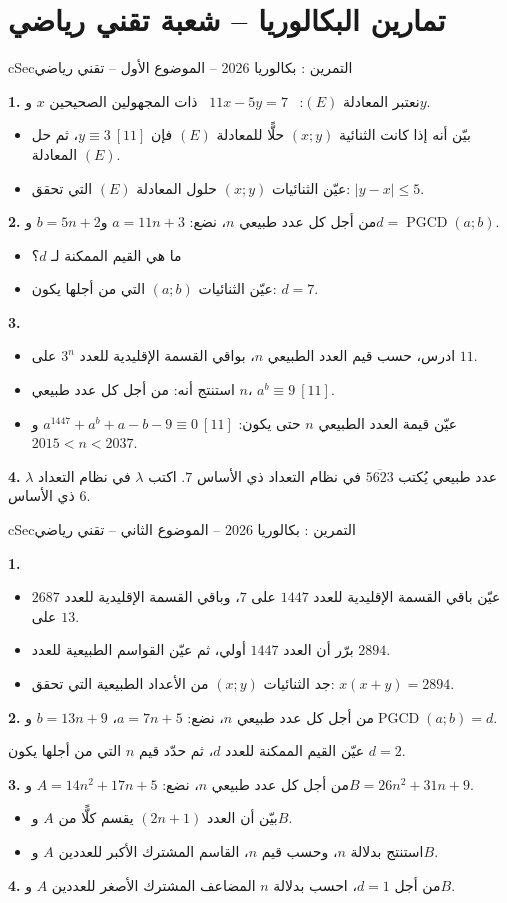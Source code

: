 \documentclass[12pt,a4paper]{article}
\newenvironment{BOX}[2]{\begin{otherlanguage}{english}\begin{arbox}{#1}{#2}}{\end{arbox}\end{otherlanguage}}
\newcounter{exo}
\newenvironment{tamrin}[1]{\stepcounter{exo}\begin{BOX}{cSec}{التمرين \theexo: #1}}{\end{BOX}}
\newcommand{\pgcd}{\operatorname{PGCD}}
\newenvironment{sq}{\begin{itemize}[leftmargin=2.4em,itemsep=3pt]}{\end{itemize}}
\newcommand{\qa}{\item[(أ)]}\newcommand{\qb}{\item[(ب)]}\newcommand{\qc}{\item[(جـ)]}\newcommand{\qd}{\item[(د)]}\newcommand{\qe}{\item[(هـ)]}
\newcommand{\QQ}[1]{\par\smallskip\textbf{#1.} }
\begin{document}
\section{تمارين البكالوريا -- شعبة تقني رياضي}
\begin{tamrin}{بكالوريا 2026 -- الموضوع الأول -- تقني رياضي}
\QQ{1} نعتبر المعادلة $(E)$: \ $11x-5y=7$ \ ذات المجهولين الصحيحين $x$ و$y$.
\begin{sq}
\qa بيّن أنه إذا كانت الثنائية $(x;y)$ حلًّا للمعادلة $(E)$ فإن $y\equiv 3\ [11]$، ثم حل المعادلة $(E)$.
\qb عيّن الثنائيات $(x;y)$ حلول المعادلة $(E)$ التي تحقق: $|y-x|\le 5$.
\end{sq}
\QQ{2} من أجل كل عدد طبيعي $n$، نضع: $a=11n+3$ و$b=5n+2$ و$d=\pgcd(a;b)$.
\begin{sq}
\qa ما هي القيم الممكنة لـ $d$؟
\qb عيّن الثنائيات $(a;b)$ التي من أجلها يكون: $d=7$.
\end{sq}
\QQ{3}
\begin{sq}
\qa ادرس، حسب قيم العدد الطبيعي $n$، بواقي القسمة الإقليدية للعدد $3^n$ على $11$.
\qb استنتج أنه: من أجل كل عدد طبيعي $n$، $a^b\equiv 9\ [11]$.
\qc عيّن قيمة العدد الطبيعي $n$ حتى يكون: $a^{1447}+a^b+a-b-9\equiv 0\ [11]$ و$2015<n<2037$.
\end{sq}
\QQ{4} $\lambda$ عدد طبيعي يُكتب $\overline{5623}$ في نظام التعداد ذي الأساس $7$. اكتب $\lambda$ في نظام التعداد ذي الأساس $6$.
\end{tamrin}

\begin{tamrin}{بكالوريا 2026 -- الموضوع الثاني -- تقني رياضي}
\QQ{1}
\begin{sq}
\qa عيّن باقي القسمة الإقليدية للعدد $1447$ على $7$، وباقي القسمة الإقليدية للعدد $2687$ على $13$.
\qb برّر أن العدد $1447$ أولي، ثم عيّن القواسم الطبيعية للعدد $2894$.
\qc جد الثنائيات $(x;y)$ من الأعداد الطبيعية التي تحقق: $x(x+y)=2894$.
\end{sq}
\QQ{2} من أجل كل عدد طبيعي $n$، نضع: $a=7n+5$، $b=13n+9$ و$\pgcd(a;b)=d$.

عيّن القيم الممكنة للعدد $d$، ثم حدّد قيم $n$ التي من أجلها يكون $d=2$.

\QQ{3} من أجل كل عدد طبيعي $n$، نضع: $A=14n^2+17n+5$ و$B=26n^2+31n+9$.
\begin{sq}
\qa بيّن أن العدد $(2n+1)$ يقسم كلًّا من $A$ و$B$.
\qb استنتج بدلالة $n$، وحسب قيم $n$، القاسم المشترك الأكبر للعددين $A$ و$B$.
\end{sq}
\QQ{4} من أجل $d=1$، احسب بدلالة $n$ المضاعف المشترك الأصغر للعددين $A$ و$B$.
\end{tamrin}
\end{document}
